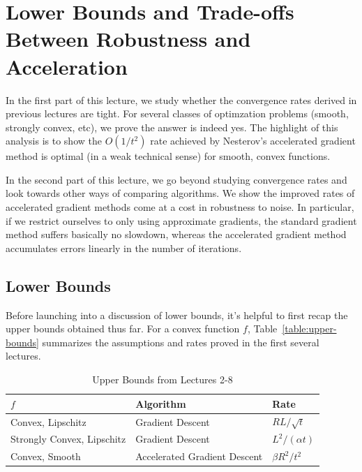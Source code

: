 \section{Lower Bounds and Trade-offs Between Robustness and Acceleration}

In the first part of this lecture, we study whether the convergence rates
derived in previous lectures are tight. For several classes of optimzation
problems (smooth, strongly convex, etc), we prove the
answer is indeed yes. The highlight of this analysis is to show the $O(1/t^2)$
rate achieved by Nesterov's accelerated gradient method is optimal (in a weak
technical sense) for smooth, convex functions. 

In the second part of this lecture, we go beyond studying convergence rates and
look towards other ways of comparing algorithms. We show the improved rates of
accelerated gradient methods come at a cost in robustness to noise. In
particular, if we restrict ourselves to only using approximate gradients, the
standard gradient method suffers basically no slowdown, whereas the accelerated
gradient method accumulates errors linearly in the number of iterations.

\subsection{Lower Bounds}
Before launching into a discussion of lower bounds, it's helpful to first recap
the upper bounds obtained thus far. For a convex function $f$,
Table~\eqref{table:upper-bounds} summarizes the assumptions and rates proved in
the first several lectures. 
~
\begin{table}[]
\centering
\caption{Upper Bounds from Lectures 2-8}
\label{table:upper-bounds}
\begin{tabular}{|l|l|l|}
\hline
$f$                        & Algorithm                    & Rate                                            \\ \hline
Convex, Lipschitz          & Gradient Descent             & $RL / \sqrt{t}$                               \\ \hline
Strongly Convex, Lipschitz & Gradient Descent             & $L^2 / (\alpha t)$                \\ \hline
Convex, Smooth             & Accelerated Gradient Descent & $\beta R^2 / t^2$ \\ \hline
\end{tabular}
\end{table}  

